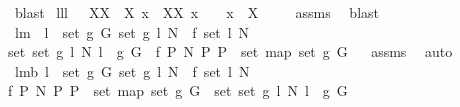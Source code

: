 \begin{isabellebody}
\ blast%
\endisatagproof
{\isafoldproof}%
%
\isadelimproof
%
\endisadelimproof
\isanewline
\isanewline
{}\isamarkupfalse%
\ lll{}{}{\isacharcolon}\ \ {\isachardoublequoteopen}{\isasymUnion}\ XX\ {\isasymsubseteq}\ X{\isachardoublequoteclose}\ {\isachardoublequoteopen}x\ {\isasymin}\ XX{\isachardoublequoteclose}\ {\isachardoublequoteopen}x\ {\isasymnoteq}\ {\isacharbraceleft}{\isacharbraceright}{\isachardoublequoteclose}\ \ {\isachardoublequoteopen}x\ {\isasyminter}\ X\ {\isasymnoteq}\ {\isacharbraceleft}{\isacharbraceright}{\isachardoublequoteclose}%
\isadelimproof
\ %
\endisadelimproof
%
\isatagproof
{}\isamarkupfalse%
\ assms\ \isamarkupfalse%
\ blast%
\endisatagproof
{\isafoldproof}%
%
\isadelimproof
%
\endisadelimproof
\isanewline
\isanewline
{}\isamarkupfalse%
\ lm{}{}{\isacharcolon}\ \ {\isachardoublequoteopen}{\isasymforall}l\ {\isasymin}\ set\ {\isacharparenleft}g{}\ G{\isacharparenright}{\isachardot}\ set\ {\isacharparenleft}g{}\ l\ N{\isacharparenright}\ {\isacharequal}\ f{}\ {\isacharparenleft}set\ l{\isacharparenright}\ N{\isachardoublequoteclose}\ \ \isanewline
{\isachardoublequoteopen}set\ {\isacharbrackleft}set\ {\isacharparenleft}g{}\ l\ N{\isacharparenright}{\isachardot}\ l\ {\isacharless}{\isacharminus}\ g{}\ G{\isacharbrackright}\ {\isacharequal}\ {\isacharbraceleft}f{}\ P\ N{\isacharbar}\ P{\isachardot}\ P\ {\isasymin}\ set\ {\isacharparenleft}map\ set\ {\isacharparenleft}g{}\ G{\isacharparenright}{\isacharparenright}{\isacharbraceright}{\isachardoublequoteclose}%
\isadelimproof
\ %
\endisadelimproof
%
\isatagproof
{}\isamarkupfalse%
\ assms\ \isamarkupfalse%
\ auto%
\endisatagproof
{\isafoldproof}%
%
\isadelimproof
%
\endisadelimproof
\isanewline
{}\isamarkupfalse%
\ lm{}{}b{\isacharcolon}\ {\isachardoublequoteopen}{\isacharparenleft}{\isasymforall}l\ {\isasymin}\ set\ {\isacharparenleft}g{}\ G{\isacharparenright}{\isachardot}\ set\ {\isacharparenleft}g{}\ l\ N{\isacharparenright}\ {\isacharequal}\ f{}\ {\isacharparenleft}set\ l{\isacharparenright}\ N{\isacharparenright}\ {\isacharminus}{\isacharminus}{\isachargreater}\ \isanewline
{\isacharbraceleft}f{}\ P\ N{\isacharbar}\ P{\isachardot}\ P\ {\isasymin}\ set\ {\isacharparenleft}map\ set\ {\isacharparenleft}g{}\ G{\isacharparenright}{\isacharparenright}{\isacharbraceright}\ {\isacharequal}\ set\ {\isacharbrackleft}set\ {\isacharparenleft}g{}\ l\ N{\isacharparenright}{\isachardot}\ l\ {\isacharless}{\isacharminus}\ g{}\ G{\isacharbrackright}{\isachardoublequoteclose}%

\end{isabellebody}

